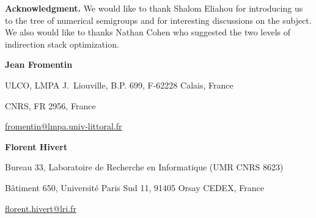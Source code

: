 \documentclass[reqno]{amsart}
\theoremstyle{plain}
\theoremstyle{definition}
\begin{document}
\textbf{Acknowledgment.} We would like to thank Shalom Eliahou for introducing us to the tree of numerical semigroups and for interesting
discussions on the subject. We also would like to thanks Nathan Cohen who
suggested the two levels of indirection stack optimization.


 

\vspace{2em}

\noindent \textbf{Jean Fromentin}

ULCO, LMPA J.~Liouville, B.P. 699, F-62228 Calais, France

CNRS, FR 2956, France

\url{fromentin@lmpa.univ-littoral.fr}

\vspace{2em}

\noindent \textbf{Florent Hivert}

Bureau 33, Laboratoire de Recherche en Informatique (UMR CNRS 8623)

B\^atiment 650, Universit\'e Paris Sud 11, 91405 Orsay CEDEX, France

\url{florent.hivert@lri.fr}
\end{document}
